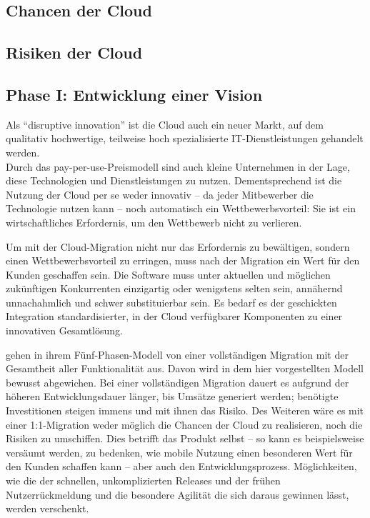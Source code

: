 \subsection{Chancen der Cloud}

\subsection{Risiken der Cloud}




\subsection{Phase I: Entwicklung einer Vision}
\label{cha:phaseI}

Als "`disruptive innovation"' ist die Cloud auch ein neuer Markt, auf dem 
qualitativ hochwertige, teilweise hoch spezialisierte IT-Dienstleistungen 
gehandelt werden. 
 \\
Durch das pay-per-use-Preismodell sind auch kleine Unternehmen in der Lage, 
diese Technologien und Dienstleistungen zu nutzen. 
 Dementsprechend ist die Nutzung der Cloud per se 
weder  innovativ -- da jeder Mitbewerber die Technologie nutzen kann -- noch 
automatisch ein Wettbewerbsvorteil: Sie ist ein wirtschaftliches Erfordernis, 
um den Wettbewerb nicht zu verlieren. 

Um mit der Cloud-Migration nicht nur das Erfordernis zu bewältigen, sondern 
einen Wettbewerbsvorteil zu erringen, muss nach der Migration ein Wert für den 
Kunden geschaffen sein. Die Software muss unter aktuellen und möglichen 
zukünftigen Konkurrenten einzigartig oder wenigstens selten sein, annähernd 
unnachahmlich und schwer substituierbar sein.
Es bedarf es der geschickten Integration standardisierter, in der Cloud 
verfügbarer Komponenten zu einer innovativen Gesamtlösung. 

 gehen in ihrem Fünf-Phasen-Modell von einer vollständigen 
Migration mit der Gesamtheit aller Funktionalität aus. Davon wird in dem hier 
vorgestellten Modell bewusst abgewichen. Bei einer vollständigen Migration 
dauert es aufgrund der höheren Entwicklungsdauer länger, bis Umsätze generiert 
werden; benötigte Investitionen steigen immens und mit ihnen das Risiko. Des 
Weiteren wäre es mit einer 1:1-Migration weder möglich die Chancen der 
Cloud zu realisieren, noch die Risiken zu umschiffen. Dies betrifft das 
Produkt selbst -- so kann es beispielsweise versäumt werden, zu bedenken, wie 
mobile Nutzung einen besonderen Wert für den Kunden schaffen kann -- aber auch 
den Entwicklungsprozess. Möglichkeiten, wie die der schnellen, unkomplizierten 
Releases und der frühen Nutzerrückmeldung und die besondere Agilität die sich 
daraus gewinnen lässt, werden verschenkt.

